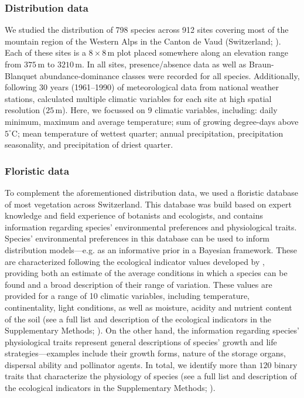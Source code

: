 \documentclass[11pt, a4paper]{article}
\begin{document}
\subsubsection*{Distribution data}
We studied the distribution of 798 species across 912 sites covering most of the mountain region of the Western Alps in the Canton de Vaud (Switzerland; \citealt{scherrerEcologicalIndicatorValues2019}). Each of these sites is a $8\times 8\,\text{m}$ plot placed somewhere along an elevation range from $375\,\text{m}$ to $3210\,\text{m}$. In all sites, presence/absence data as well as Braun-Blanquet abundance-dominance classes were recorded for all species. Additionally, following 30 years (1961–1990) of meteorological data from national weather stations, \citet{scherrerEcologicalIndicatorValues2019} calculated multiple climatic variables for each site at high spatial resolution ($25\,\text{m}$). Here, we focussed on 9 climatic variables, including: daily minimum, maximum and average temperature; sum of growing degree-days above $5^{\circ}\text{C}$; mean temperature of wettest quarter; annual precipitation, precipitation seasonality, and precipitation of driest quarter. %

\subsubsection*{Floristic data}
To complement the aforementioned distribution data, we used a floristic database of most vegetation across Switzerland. This database was build based on expert knowledge and field experience of botanists and ecologists, and contains information regarding species' environmental preferences and physiological traits. Species' environmental preferences in this database can be used to inform distribution models---e.g. as an informative prior in a Bayesian framework. These are characterized following the ecological indicator values developed by \citet{landoltFloraIndicativaOkologische2010}, providing both an estimate of the average conditions in which a species can be found and a broad description of their range of variation. These values are provided for a range of 10 climatic variables, including temperature, continentality, light conditions, as well as moisture, acidity and nutrient content of the soil (see a full list and description of the ecological indicators in the Supplementary Methods; \citealt{landoltFloraIndicativaOkologische2010}). On the other hand, the information regarding species' physiological traits represent general descriptions of species' growth and life strategies---examples include their growth forms, nature of the storage organs, dispersal ability and pollinator agents. In total, we identify more than $120$ binary traits that characterize the physiology of species (see a full list and description of the ecological indicators in the Supplementary Methods; \citealt{landoltFloraIndicativaOkologische2010}).  
\end{document}
